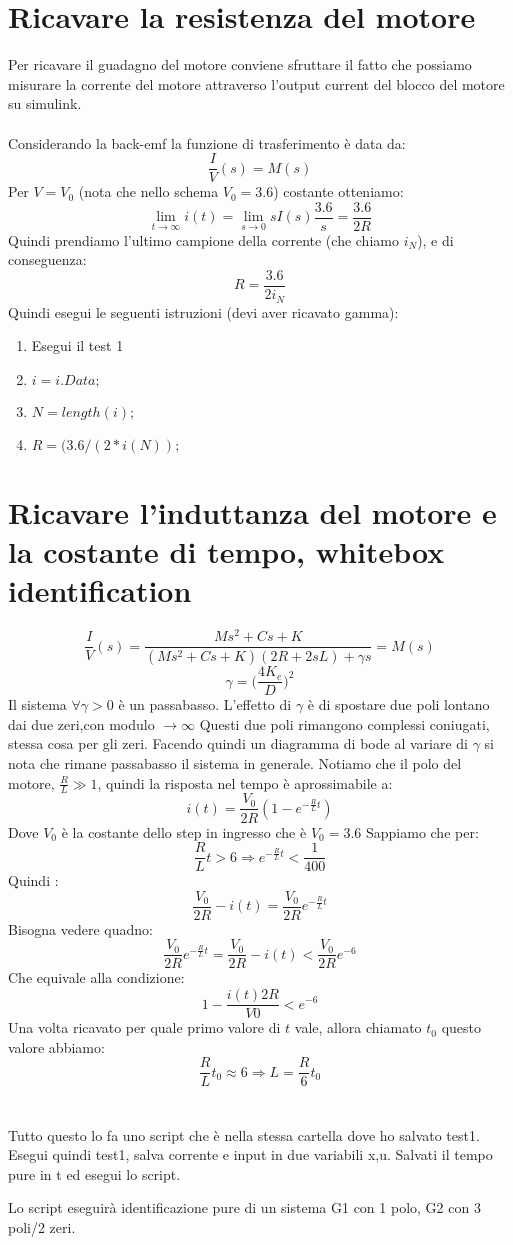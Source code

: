 \documentclass[10pt,a4paper]{article}
\begin{document}
\newpage
\section{Ricavare la resistenza del motore}
Per ricavare il guadagno del motore conviene sfruttare il fatto che possiamo misurare la corrente del motore attraverso l'output current del blocco del motore su simulink. \\ \\
Considerando la back-emf la funzione di trasferimento è data da:
$$\frac{I}{V}(s) = M(s)$$
Per $V=V_0$ (nota che nello schema $V_0=3.6$) costante otteniamo:
$$\lim_{t \to \infty} i(t) = \lim_{s \to 0} sI(s)\frac{3.6}{s} = \frac{3.6}{2R}$$
Quindi prendiamo l'ultimo campione della corrente (che chiamo $i_N$), e di conseguenza:
$$R = \frac{3.6}{2i_N}$$
Quindi esegui le seguenti istruzioni (devi aver ricavato gamma):
\begin{enumerate}
\item Esegui il test 1
\item $i=i.Data;$
\item $N=length(i);$
\item $ R = (3.6/(2*i(N));$
\end{enumerate}
\section{Ricavare l'induttanza del motore e la costante di tempo, whitebox identification}
$$\frac{I}{V}(s) = \frac{Ms^2+Cs+K}{(Ms^2+Cs+K)(2R+2sL)+\gamma s } =M(s)$$
$$\gamma = \Big(\frac{4K_e}{D}\Big)^2$$
Il sistema $\forall \gamma > 0$ è un passabasso. L'effetto di $\gamma$ è di spostare due poli lontano dai due zeri,con modulo $\to \infty$ Questi due poli rimangono complessi coniugati, stessa cosa per gli zeri. Facendo quindi un diagramma di bode al variare di $\gamma$ si nota che rimane passabasso il sistema in generale. Notiamo che il polo del motore, $\frac{R}{L} \gg 1$, quindi la risposta nel tempo è aprossimabile a:
$$i(t) = \frac{V_0}{2R}(1-e^{-\frac{R}{L}t})$$
Dove $V_0$ è la costante dello step in ingresso che è $V_0=3.6$
Sappiamo che per:
$$\frac{R}{L}t > 6 \Rightarrow e^{-\frac{R}{L}t} < \frac{1}{400}$$
Quindi :
$$\frac{V_0}{2R} - i(t) = \frac{V_0}{2R}e^{-\frac{R}{L}t}$$
Bisogna vedere quadno:
$$\frac{V_0}{2R}e^{-\frac{R}{L}t}= \frac{V_0}{2R} - i(t) < \frac{V_0}{2R}e^{-6}$$
Che equivale alla condizione:
$$1- \frac{i(t)2R}{V0} < e^{-6}$$
Una volta ricavato per quale primo valore di $t$ vale, allora chiamato $t_0$ questo valore abbiamo:
$$\frac{R}{L}t_0 \approx 6 \Rightarrow L = \frac{R}{6}t_0$$\\ \\

Tutto questo lo fa uno script che è nella stessa cartella dove ho salvato test1. Esegui quindi test1, salva corrente e input in due variabili x,u. Salvati il tempo pure in t ed esegui lo script.

Lo script eseguirà identificazione pure di un sistema G1 con 1 polo, G2 con 3 poli/2 zeri.
\end{document}
